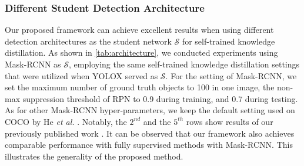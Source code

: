 \documentclass[journal,twoside,web]{ieeecolor}
\begin{document}
\begin{table}[t]
\caption{Ablation study on the architecture of $\mathcal{S}$.}
\label{tab:architecture}
\begin{center}
\end{center}
\vskip -0.15in
\end{table}

\subsubsection{Different Student Detection Architecture}
Our proposed framework can achieve excellent results when using different detection architectures as the student network $\mathcal{S}$ for self-trained knowledge distillation. As shown in \autoref{tab:architecture}, we conducted experiments using Mask-RCNN \cite{he2017mask} as $\mathcal{S}$, employing the same self-trained knowledge distillation settings that were utilized when YOLOX served as $\mathcal{S}$. For the setting of Mask-RCNN, we set the maximum number of ground truth objects to 100 in one image, the non-max suppression threshold of RPN to 0.9 during training, and 0.7 during testing. As for other Mask-RCNN hyper-parameters, we keep the default setting used on COCO by He \textit{et al.} \cite{he2017mask}. Notably, the $2^{nd}$ and the $5^{th}$ rows show results of our previously published work \cite{wu2023zeroshot}. It can be observed that our framework also achieves comparable performance with fully supervised methods with Mask-RCNN. This illustrates the generality of the proposed method.
\end{document}
